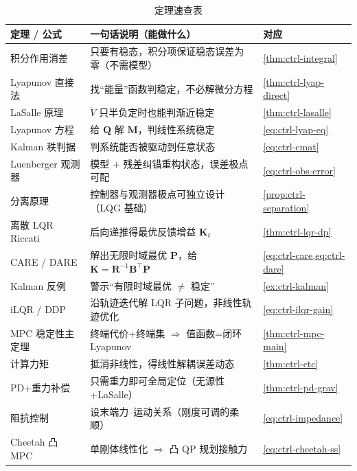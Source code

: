 \begin{table}[H]\centering\small
\caption{定理速查表}
\label{tab:ctrl-thm}
\begin{tabular}{lll}
\toprule
定理 / 公式 & 一句话说明（能做什么） & 对应 \\
\midrule
积分作用消差 & 只要有稳态，积分项保证稳态误差为零（不需模型） & \cref{thm:ctrl-integral} \\
Lyapunov 直接法 & 找“能量”函数判稳定，不必解微分方程 & \cref{thm:ctrl-lyap-direct} \\
LaSalle 原理 & $\dot V$ 只半负定时也能判渐近稳定 & \cref{thm:ctrl-lasalle} \\
Lyapunov 方程 & 给 $\mathbf{Q}$ 解 $\mathbf{M}$，判线性系统稳定 & \cref{eq:ctrl-lyap-eq} \\
Kalman 秩判据 & 判系统能否被驱动到任意状态 & \cref{eq:ctrl-cmat} \\
Luenberger 观测器 & 模型 + 残差纠错重构状态，误差极点可配 & \cref{eq:ctrl-obs-error} \\
分离原理 & 控制器与观测器极点可独立设计（LQG 基础） & \cref{prop:ctrl-separation} \\
离散 LQR Riccati & 后向递推得最优反馈增益 $\mathbf{K}_t$ & \cref{thm:ctrl-lqr-dp} \\
CARE / DARE & 解出无限时域最优 $\mathbf{P}$，给 $\mathbf{K}=\mathbf{R}^{-1}\mathbf{B}^\top\mathbf{P}$ & \cref{eq:ctrl-care,eq:ctrl-dare} \\
Kalman 反例 & 警示“有限时域最优 $\ne$ 稳定” & \cref{ex:ctrl-kalman} \\
iLQR / DDP & 沿轨迹迭代解 LQR 子问题，非线性轨迹优化 & \cref{eq:ctrl-ilqr-gain} \\
MPC 稳定性主定理 & 终端代价+终端集 $\Rightarrow$ 值函数=闭环 Lyapunov & \cref{thm:ctrl-mpc-main} \\
计算力矩 & 抵消非线性，得线性解耦误差动态 & \cref{thm:ctrl-ctc} \\
PD+重力补偿 & 只需重力即可全局定位（无源性+LaSalle） & \cref{thm:ctrl-pd-grav} \\
阻抗控制 & 设末端力--运动关系（刚度可调的柔顺） & \cref{eq:ctrl-impedance} \\
Cheetah 凸 MPC & 单刚体线性化 $\Rightarrow$ 凸 QP 规划接触力 & \cref{eq:ctrl-cheetah-ss} \\
\bottomrule
\end{tabular}
\end{table}

